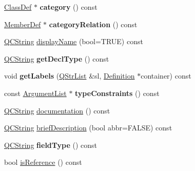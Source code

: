 \begin{DoxyCompactItemize}
\item 
\mbox{\label{class_member_def_a394c0748a0b755c27467f7a27087268d}} 
\mbox{\hyperlink{class_class_def}{Class\+Def}} $\ast$ {\bfseries category} () const
\item 
\mbox{\label{class_member_def_aa01511153d25ce410306ad381d9695fc}} 
\mbox{\hyperlink{class_member_def}{Member\+Def}} $\ast$ {\bfseries category\+Relation} () const
\item 
\mbox{\hyperlink{class_q_c_string}{Q\+C\+String}} \mbox{\hyperlink{class_member_def_a3c91c8522caa2b1905cd52b3eedad8fa}{display\+Name}} (bool=T\+R\+UE) const
\item 
\mbox{\label{class_member_def_a3a77b11aaff692cebd7ee7b04ca8317d}} 
\mbox{\hyperlink{class_q_c_string}{Q\+C\+String}} {\bfseries get\+Decl\+Type} () const
\item 
\mbox{\label{class_member_def_adeeae6193812707816901c6edc773a03}} 
void {\bfseries get\+Labels} (\mbox{\hyperlink{class_q_str_list}{Q\+Str\+List}} \&sl, \mbox{\hyperlink{class_definition}{Definition}} $\ast$container) const
\item 
\mbox{\label{class_member_def_aa321353111f490af5dac3ac3cf8fee80}} 
const \mbox{\hyperlink{class_argument_list}{Argument\+List}} $\ast$ {\bfseries type\+Constraints} () const
\item 
\mbox{\hyperlink{class_q_c_string}{Q\+C\+String}} \mbox{\hyperlink{class_member_def_a0a534c3dba8dced3afa746c535afb59b}{documentation}} () const
\item 
\mbox{\hyperlink{class_q_c_string}{Q\+C\+String}} \mbox{\hyperlink{class_member_def_ab4ad34e63730bc94f076b920b3b9084e}{brief\+Description}} (bool abbr=F\+A\+L\+SE) const
\item 
\mbox{\label{class_member_def_a01dc28e790e9c7c154e9ae084cd64782}} 
\mbox{\hyperlink{class_q_c_string}{Q\+C\+String}} {\bfseries field\+Type} () const
\item 
bool \mbox{\hyperlink{class_member_def_a285b80c1f135ce6ed9fa3a52e1435538}{is\+Reference}} () const
\item 
\mbox{\label{class_member_def_ae80dc17b7425a71d59b7574e0a8e6ffc}} 

\end{DoxyCompactItemize}
